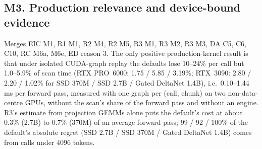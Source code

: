 \documentclass[11pt]{article}
\begin{document}
\subsection*{M3. Production relevance and device-bound evidence}
Merges EIC M1, R1 M1, R2 M4, R2 M5, R3 M1, R3 M2, R3 M3, DA C5, C6, C10, RC
M6a, M6e, ED reason 3. The only positive production-kernel result is that
under isolated CUDA-graph replay the defaults lose 10--24\% per call but
1.0--5.9\% of scan time (RTX PRO~6000: 1.75 / 5.85 / 3.19\%; RTX~3090: 2.80 /
2.20 / 1.02\% for SSD 370M / SSD 2.7B / Gated DeltaNet 1.4B), i.e.\
0.10--1.44\,ms per forward pass, measured with one graph per (call, chunk) on
two non-data-centre GPUs, without the scan's share of the forward pass and
without an engine. R3's estimate from projection GEMMs alone puts the
default's cost at about 0.3\% (2.7B) to 0.7\% (370M) of an average forward
pass; 99 / 92 / 100\% of the default's absolute regret (SSD 2.7B / SSD 370M /
Gated DeltaNet 1.4B) comes from calls under 4096 tokens.
\end{document}
